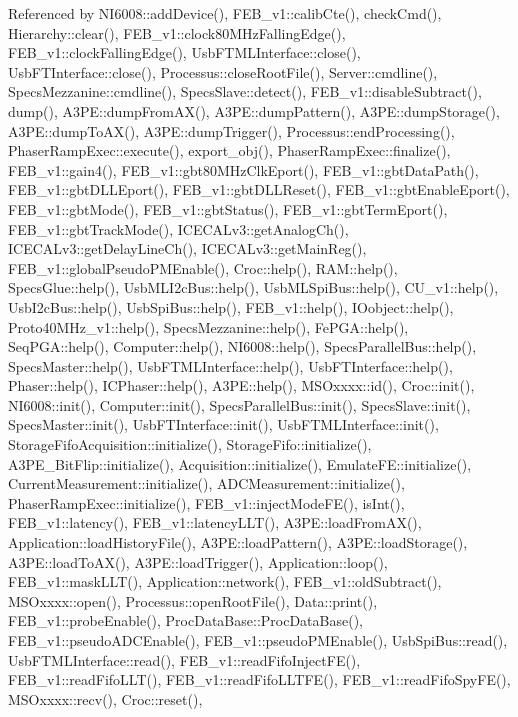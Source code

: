 Referenced by N\+I6008\+::add\+Device(), F\+E\+B\+\_\+v1\+::calib\+Cte(), check\+Cmd(), Hierarchy\+::clear(), F\+E\+B\+\_\+v1\+::clock80\+M\+Hz\+Falling\+Edge(), F\+E\+B\+\_\+v1\+::clock\+Falling\+Edge(), Usb\+F\+T\+M\+L\+Interface\+::close(), Usb\+F\+T\+Interface\+::close(), Processus\+::close\+Root\+File(), Server\+::cmdline(), Specs\+Mezzanine\+::cmdline(), Specs\+Slave\+::detect(), F\+E\+B\+\_\+v1\+::disable\+Subtract(), dump(), A3\+P\+E\+::dump\+From\+A\+X(), A3\+P\+E\+::dump\+Pattern(), A3\+P\+E\+::dump\+Storage(), A3\+P\+E\+::dump\+To\+A\+X(), A3\+P\+E\+::dump\+Trigger(), Processus\+::end\+Processing(), Phaser\+Ramp\+Exec\+::execute(), export\+\_\+obj(), Phaser\+Ramp\+Exec\+::finalize(), F\+E\+B\+\_\+v1\+::gain4(), F\+E\+B\+\_\+v1\+::gbt80\+M\+Hz\+Clk\+Eport(), F\+E\+B\+\_\+v1\+::gbt\+Data\+Path(), F\+E\+B\+\_\+v1\+::gbt\+D\+L\+L\+Eport(), F\+E\+B\+\_\+v1\+::gbt\+D\+L\+L\+Reset(), F\+E\+B\+\_\+v1\+::gbt\+Enable\+Eport(), F\+E\+B\+\_\+v1\+::gbt\+Mode(), F\+E\+B\+\_\+v1\+::gbt\+Status(), F\+E\+B\+\_\+v1\+::gbt\+Term\+Eport(), F\+E\+B\+\_\+v1\+::gbt\+Track\+Mode(), I\+C\+E\+C\+A\+Lv3\+::get\+Analog\+Ch(), I\+C\+E\+C\+A\+Lv3\+::get\+Delay\+Line\+Ch(), I\+C\+E\+C\+A\+Lv3\+::get\+Main\+Reg(), F\+E\+B\+\_\+v1\+::global\+Pseudo\+P\+M\+Enable(), Croc\+::help(), R\+A\+M\+::help(), Specs\+Glue\+::help(), Usb\+M\+L\+I2c\+Bus\+::help(), Usb\+M\+L\+Spi\+Bus\+::help(), C\+U\+\_\+v1\+::help(), Usb\+I2c\+Bus\+::help(), Usb\+Spi\+Bus\+::help(), F\+E\+B\+\_\+v1\+::help(), I\+Oobject\+::help(), Proto40\+M\+Hz\+\_\+v1\+::help(), Specs\+Mezzanine\+::help(), Fe\+P\+G\+A\+::help(), Seq\+P\+G\+A\+::help(), Computer\+::help(), N\+I6008\+::help(), Specs\+Parallel\+Bus\+::help(), Specs\+Master\+::help(), Usb\+F\+T\+M\+L\+Interface\+::help(), Usb\+F\+T\+Interface\+::help(), Phaser\+::help(), I\+C\+Phaser\+::help(), A3\+P\+E\+::help(), M\+S\+Oxxxx\+::id(), Croc\+::init(), N\+I6008\+::init(), Computer\+::init(), Specs\+Parallel\+Bus\+::init(), Specs\+Slave\+::init(), Specs\+Master\+::init(), Usb\+F\+T\+Interface\+::init(), Usb\+F\+T\+M\+L\+Interface\+::init(), Storage\+Fifo\+Acquisition\+::initialize(), Storage\+Fifo\+::initialize(), A3\+P\+E\+\_\+\+Bit\+Flip\+::initialize(), Acquisition\+::initialize(), Emulate\+F\+E\+::initialize(), Current\+Measurement\+::initialize(), A\+D\+C\+Measurement\+::initialize(), Phaser\+Ramp\+Exec\+::initialize(), F\+E\+B\+\_\+v1\+::inject\+Mode\+F\+E(), is\+Int(), F\+E\+B\+\_\+v1\+::latency(), F\+E\+B\+\_\+v1\+::latency\+L\+L\+T(), A3\+P\+E\+::load\+From\+A\+X(), Application\+::load\+History\+File(), A3\+P\+E\+::load\+Pattern(), A3\+P\+E\+::load\+Storage(), A3\+P\+E\+::load\+To\+A\+X(), A3\+P\+E\+::load\+Trigger(), Application\+::loop(), F\+E\+B\+\_\+v1\+::mask\+L\+L\+T(), Application\+::network(), F\+E\+B\+\_\+v1\+::old\+Subtract(), M\+S\+Oxxxx\+::open(), Processus\+::open\+Root\+File(), Data\+::print(), F\+E\+B\+\_\+v1\+::probe\+Enable(), Proc\+Data\+Base\+::\+Proc\+Data\+Base(), F\+E\+B\+\_\+v1\+::pseudo\+A\+D\+C\+Enable(), F\+E\+B\+\_\+v1\+::pseudo\+P\+M\+Enable(), Usb\+Spi\+Bus\+::read(), Usb\+F\+T\+M\+L\+Interface\+::read(), F\+E\+B\+\_\+v1\+::read\+Fifo\+Inject\+F\+E(), F\+E\+B\+\_\+v1\+::read\+Fifo\+L\+L\+T(), F\+E\+B\+\_\+v1\+::read\+Fifo\+L\+L\+T\+F\+E(), F\+E\+B\+\_\+v1\+::read\+Fifo\+Spy\+F\+E(), M\+S\+Oxxxx\+::recv(), Croc\+::reset(), 